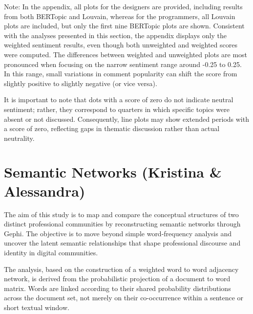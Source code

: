 \documentclass[conference]{IEEEtran}
\begin{document}
Note: In the appendix, all plots for the designers are provided, including results from both BERTopic and Louvain, whereas for the programmers, all Louvain plots are included, but only the first nine BERTopic plots are shown. Consistent with the analyses presented in this section, the appendix displays only the weighted sentiment results, even though both unweighted and weighted scores were computed. The differences between weighted and unweighted plots are most pronounced when focusing on the narrow sentiment range around -0.25 to 0.25. In this range, small variations in comment popularity can shift the score from slightly positive to slightly negative (or vice versa).

It is important to note that dots with a score of zero do not indicate neutral sentiment; rather, they correspond to quarters in which specific topics were absent or not discussed. Consequently, line plots may show extended periods with a score of zero, reflecting gaps in thematic discussion rather than actual neutrality.

\section{Semantic Networks (Kristina \& Alessandra)}

The aim of this study is to map and compare the conceptual structures of two distinct professional communities by reconstructing semantic networks through Gephi. The objective is to move beyond simple word-frequency analysis and uncover the latent semantic relationships that shape professional discourse and identity in digital communities.

The analysis, based on the construction of a weighted word to word adjacency network, is derived from the probabilistic projection of a document to word matrix. Words are linked according to their shared probability distributions across the document set, not merely on their co-occurrence within a sentence or short textual window.
\end{document}
